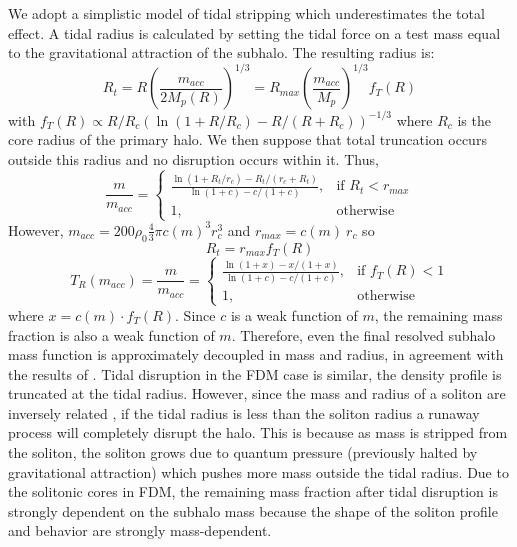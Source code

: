 \documentclass[usenatbib]{mnras}
\begin{document}
	We adopt a simplistic model of tidal stripping which underestimates the total effect. A tidal radius is calculated by setting the tidal force on a test mass equal to the gravitational attraction of the subhalo. The resulting radius is:
\begin{equation}
R_t = R \left(\frac{m_{acc}}{2M_p(R)}\right)^{1/3} =  R_{max} \left(\frac{m_{acc}}{M_p}\right)^{1/3} f_T(R)
\end{equation} 
with $f_T(R) \propto R/R_c(\ln(1+R/R_c) - R/(R+R_c))^{-1/3}$ where $R_c$ is the core radius of the primary halo. We then suppose that total truncation occurs outside this radius and no disruption occurs within it. Thus,
\begin{equation}
\frac{m}{m_{acc}} = 
\begin{cases}
    \frac{\ln{(1+R_t/r_c)} - R_t/(r_c+R_t)}{\ln{(1+c)} - c/(1+c)},& \text{if } R_t < r_{max}\\
    1,              & \text{otherwise}
\end{cases}
\end{equation} 
However, $m_{acc} = 200 \rho_0 \frac{4}{3} \pi c(m)^3 r_c^3$ and $r_{max} = c(m) \: r_{c}$ so 
\begin{equation}
R_t = r_{max} f_T(R)
\end{equation}
\begin{equation} \label{trunc}
T_R(m_{acc}) =  \frac{m}{m_{acc}} = 
\begin{cases}
    \frac{\ln{(1 + x)} - x/(1 + x)}{\ln{(1+c)} - c/(1+c)},& \text{if } f_T(R) < 1\\
    1,              & \text{otherwise}
\end{cases}
\end{equation} where $x = c(m) \cdot f_T(R)$. Since $c$ is a weak function of $m$, the remaining mass fraction is also a weak function of $m$. Therefore, even the final resolved subhalo mass function is approximately decoupled in mass and radius, in agreement with the results of \citet{unified_model}. Tidal disruption in the FDM case is similar, the density profile is truncated at the tidal radius. However, since the mass and radius of a soliton are inversely related \citep{solitons}, if the tidal radius is less than the soliton radius a runaway process will completely disrupt the halo. This is because as mass is stripped from the soliton, the soliton grows due to quantum pressure (previously halted by gravitational attraction) which pushes more mass outside the tidal radius. Due to the solitonic cores in FDM, the remaining mass fraction after tidal disruption is strongly dependent on the subhalo mass because the shape of the soliton profile and behavior are strongly mass-dependent. 
\end{document}
